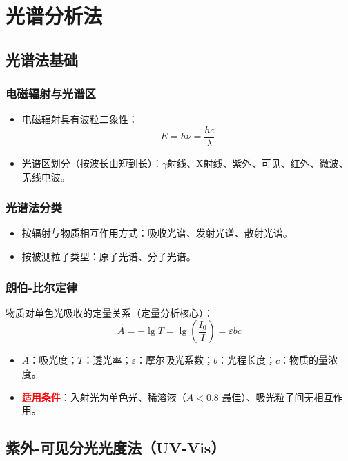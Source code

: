 \documentclass[11pt,a4paper]{article}
\newcommand{\core}[1]{\textcolor{red}{\textbf{#1}}}
\begin{document}
\newpage
\section{光谱分析法}

\subsection{光谱法基础}

\subsubsection{电磁辐射与光谱区}
\begin{itemize}
    \item 电磁辐射具有波粒二象性：
    \[
    \boxed{E = h\nu = \frac{hc}{\lambda}}
    \]
    \item 光谱区划分（按波长由短到长）：\(\gamma\)射线、X射线、紫外、可见、红外、微波、无线电波。
\end{itemize}

\subsubsection{光谱法分类}
\begin{itemize}
    \item 按辐射与物质相互作用方式：吸收光谱、发射光谱、散射光谱。
    \item 按被测粒子类型：原子光谱、分子光谱。
\end{itemize}

\subsubsection{朗伯-比尔定律}
物质对单色光吸收的定量关系（定量分析核心）：
\[
\boxed{A = -\lg T = \lg \left( \frac{I_0}{I} \right) = \varepsilon b c}
\]
\begin{itemize}
    \item \( A \)：吸光度；\( T \)：透光率；\( \varepsilon \)：摩尔吸光系数；\( b \)：光程长度；\( c \)：物质的量浓度。
    \item \core{适用条件}：入射光为单色光、稀溶液（\( A < 0.8 \) 最佳）、吸光粒子间无相互作用。
\end{itemize}

\subsection{紫外-可见分光光度法（UV-Vis）}
\end{document}
